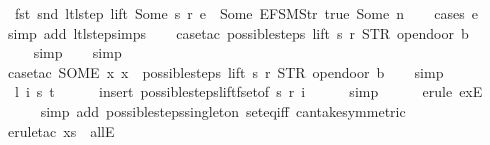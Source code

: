 \begin{isabellebody}
\ \ fst\ {\isacharparenleft}snd\ {\isacharparenleft}ltl{\isacharunderscore}step\ lift\ {\isacharparenleft}Some\ s{\isacharparenright}\ r\ e{\isacharparenright}{\isacharparenright}\ {\isasymnoteq}\ {\isacharbrackleft}Some\ {\isacharparenleft}EFSM{\isachardot}Str\ {\isacharprime}{\isacharprime}true{\isacharprime}{\isacharprime}{\isacharparenright}{\isacharcomma}\ Some\ n{\isacharbrackright}{\isachardoublequoteclose}\isanewline
%
\isadelimproof
\ \ %
\endisadelimproof
%
\isatagproof
{}\isamarkupfalse%
\ {\isacharparenleft}cases\ e{\isacharparenright}\isanewline
\ \ \isamarkupfalse%
\ {\isacharparenleft}simp\ add{\isacharcolon}\ ltl{\isacharunderscore}step{\isachardot}simps{\isacharparenright}\isanewline
\ \ \isamarkupfalse%
\ {\isacharparenleft}case{\isacharunderscore}tac\ {\isachardoublequoteopen}possible{\isacharunderscore}steps\ lift\ s\ r\ STR\ {\isacharprime}{\isacharprime}opendoor{\isacharprime}{\isacharprime}\ b\ {\isacharequal}\ {\isacharbraceleft}{\isacharbar}{\isacharbar}{\isacharbraceright}{\isachardoublequoteclose}{\isacharparenright}\isanewline
\ \ \ \isamarkupfalse%
\ simp\isanewline
\ \ \isamarkupfalse%
\ simp\isanewline
\ \ \isamarkupfalse%
\ {\isacharparenleft}case{\isacharunderscore}tac\ {\isachardoublequoteopen}SOME\ x{\isachardot}\ x\ {\isacharbar}{\isasymin}{\isacharbar}\ possible{\isacharunderscore}steps\ lift\ s\ r\ STR\ {\isacharprime}{\isacharprime}opendoor{\isacharprime}{\isacharprime}\ b{\isachardoublequoteclose}{\isacharparenright}\isanewline
\ \ \isamarkupfalse%
\ simp\isanewline
\ \ \isamarkupfalse%
\ \ l\ i\ s{\isacharprime}\ t\isanewline
\ \ \ \ \isamarkupfalse%
\ {\isacharparenleft}insert\ possible{\isacharunderscore}steps{\isacharunderscore}lift{\isacharunderscore}fset{\isacharbrackleft}of\ s\ r\ i{\isacharbrackright}{\isacharparenright}\isanewline
\ \ \ \ \isamarkupfalse%
\ simp\isanewline
\ \ \ \ \isamarkupfalse%
\ {\isacharparenleft}erule\ exE{\isacharparenright}{\isacharplus}\isanewline
\ \ \ \ \isamarkupfalse%
\ {\isacharparenleft}simp\ add{\isacharcolon}\ possible{\isacharunderscore}steps{\isacharunderscore}singleton\ set{\isacharunderscore}eq{\isacharunderscore}iff\ can{\isacharunderscore}take{\isacharbrackleft}symmetric{\isacharbrackright}{\isacharparenright}\isanewline
\ \ \ \ \isamarkupfalse%
\ {\isacharparenleft}erule{\isacharunderscore}tac\ x{\isacharequal}s\ \ allE{\isacharparenright}\isanewline

\end{isabellebody}
